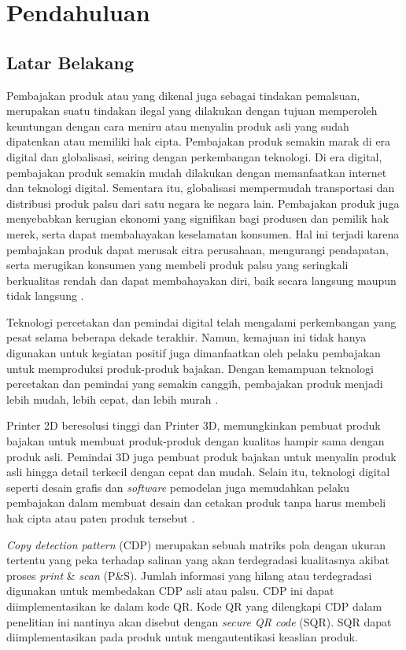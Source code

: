 \chapter{Pendahuluan}

\section{Latar Belakang}
Pembajakan produk atau yang dikenal juga sebagai tindakan pemalsuan, merupakan suatu tindakan ilegal yang dilakukan dengan tujuan memperoleh keuntungan dengan
cara meniru atau menyalin produk asli yang sudah dipatenkan atau memiliki hak cipta. Pembajakan produk semakin marak di era digital dan globalisasi, seiring
dengan perkembangan teknologi. Di era digital, pembajakan produk semakin mudah dilakukan dengan memanfaatkan internet dan teknologi digital. Sementara itu,
globalisasi mempermudah transportasi dan distribusi produk palsu dari satu negara ke negara lain. Pembajakan produk juga menyebabkan kerugian ekonomi yang
signifikan bagi produsen dan pemilik hak merek, serta dapat membahayakan keselamatan konsumen. Hal ini terjadi karena pembajakan produk dapat merusak citra
perusahaan, mengurangi pendapatan, serta merugikan konsumen yang membeli produk palsu yang seringkali berkualitas rendah dan dapat membahayakan diri, baik
secara langsung maupun tidak langsung \cite{BASCAP2016}.

Teknologi percetakan dan pemindai digital telah mengalami perkembangan yang pesat selama beberapa dekade terakhir. Namun, kemajuan ini tidak hanya digunakan
untuk kegiatan positif juga dimanfaatkan oleh pelaku pembajakan untuk memproduksi produk-produk bajakan. Dengan kemampuan teknologi percetakan dan pemindai
yang semakin canggih, pembajakan produk menjadi lebih mudah, lebih cepat, dan lebih murah \cite{HILL2007DIGITAL}.

Printer 2D beresolusi tinggi dan Printer 3D, memungkinkan pembuat produk bajakan untuk membuat produk-produk dengan kualitas hampir sama dengan produk asli.
Pemindai 3D juga pembuat produk bajakan untuk menyalin produk asli hingga detail terkecil dengan cepat dan mudah. Selain itu, teknologi digital seperti desain
grafis dan \emph{software} pemodelan juga memudahkan pelaku pembajakan dalam membuat desain dan cetakan produk tanpa harus membeli hak cipta atau paten produk
tersebut \cite{DEPOORTER2013INTELECTUAL}.

\emph{Copy detection pattern} (CDP) merupakan sebuah matriks pola dengan ukuran tertentu yang peka terhadap salinan yang akan terdegradasi kualitasnya akibat proses \emph{print} \&
\emph{scan} (P\&S). Jumlah informasi yang hilang atau terdegradasi digunakan untuk membedakan CDP asli atau palsu. CDP ini dapat diimplementasikan ke dalam kode QR.
Kode QR yang dilengkapi CDP dalam penelitian ini nantinya akan disebut dengan \emph{secure QR code} (SQR). SQR dapat diimplementasikan pada produk untuk
mengautentikasi keaslian produk.

